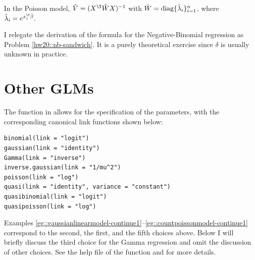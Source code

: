 \begin{example}[continued]\label{eg::countpoissonmodel-continue1}
In the Poisson model,  
$
\hat{V} = (X^{\T} \hat{W} X)^{-1}
$
with  $\hat{W}= \textup{diag}\{ \hat{\lambda}_i   \}_{i=1}^n $, where $\hat{\lambda}_i  = e^{x_i^{\T} \hat{\beta}}.$
\end{example}


I relegate the derivation of the formula for the Negative-Binomial regression as Problem \ref{hw20::nb-sandwich}. It is a purely theoretical exercise since $\delta$ is usually unknown in practice.


\section{Other GLMs}


The  function in  allows for the specification of the  parameters, with the corresponding canonical link functions shown below: 
\begin{lstlisting}
binomial(link = "logit")
gaussian(link = "identity")
Gamma(link = "inverse")
inverse.gaussian(link = "1/mu^2")
poisson(link = "log")
quasi(link = "identity", variance = "constant")
quasibinomial(link = "logit")
quasipoisson(link = "log")
\end{lstlisting}
Examples \ref{eg::gaussianlinearmodel-continue1}--\ref{eg::countpoissonmodel-continue1} correspond to the second, the first, and the fifth choices above. Below I will briefly discuss the third choice for the Gamma regression and omit the discussion of other choices. See the help file of the  function and \citet{mccullagh1989generalized} for more details. 


